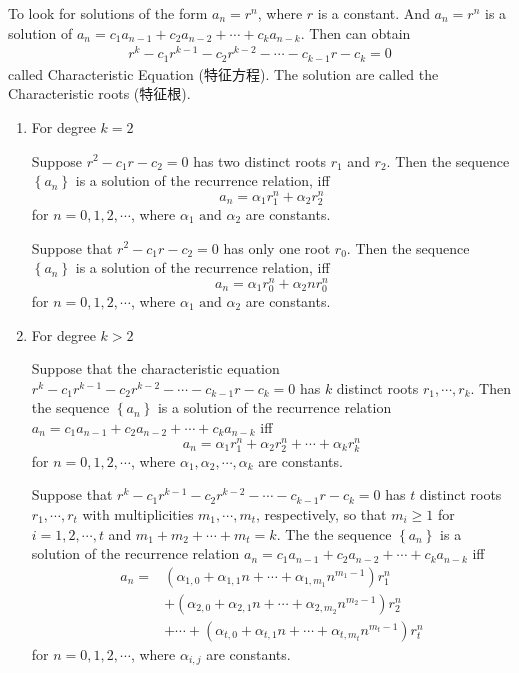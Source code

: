 To look for solutions of the form $a_n=r^n$, where $r$ is a constant. And $a_n=r^n$ is a solution of $a_n = c_1a_{n-1} + c_2a_{n-2}+ \cdots + c_k a_{n-k}$. Then can obtain
\begin{align*}
    r^k-c_1r^{k-1} - c_2r^{k-2}- \cdots - c_{k-1}r- c_k=0
\end{align*}
called Characteristic Equation (特征方程). The solution are called the Characteristic roots (特征根). 
\begin{enumerate}
    \item For degree $k=2$
    \begin{theorem}
        Suppose $r^2-c_1r-c_2=0$ has two distinct roots $r_1$ and $r_2$. Then the sequence $\left\{a_n\right\}$ is a solution of the recurrence relation, iff 
        \[a_n=\alpha_1r_1^n+\alpha_2r_2^n\]
        for $n=0,1,2,\cdots$, where $\alpha_1 \text{ and } \alpha_2$ are constants. 
    \end{theorem}
    \begin{theorem}
        Suppose that $r^2-c_1r-c_2=0$ has only one root $r_0$. Then the sequence $\left\{a_n\right\}$ is a solution of the recurrence relation, iff 
        \[ a_n=\alpha_1 r_0^n + \alpha_2 n r_0^n \]
        for $n=0,1,2,\cdots$, where $\alpha_1 \text{ and } \alpha_2$ are constants. 
    \end{theorem}
    \item For degree $k>2$
    \begin{theorem}
        Suppose that the characteristic equation $r^k-c_1r^{k-1} - c_2r^{k-2}- \cdots - c_{k-1}r- c_k=0$ has $k$ distinct roots $r_1,\cdots,r_k$. Then the sequence $\left\{ a_n \right\}$ is a solution of the recurrence relation $a_n = c_1a_{n-1} + c_2a_{n-2}+ \cdots + c_k a_{n-k}$ iff
        \[ a_n=\alpha_1r_1^n+\alpha_2r_2^n+\cdots +\alpha_kr_k^n \]
        for $n=0,1,2,\cdots$, where $\alpha_1,\alpha_2,\cdots ,\alpha_k$ are constants.
    \end{theorem}

    \begin{theorem}
        Suppose that $r^k-c_1r^{k-1} - c_2r^{k-2}- \cdots - c_{k-1}r- c_k=0$ has $t$ distinct roots $r_1,\cdots, r_t$ with multiplicities $m_1,\cdots, m_t$, respectively, so that $m_i \ge 1$ for $i=1,2,\cdots,t$ and $m_1+m_2+\cdots +m_t=k$. The the sequence $\left\{ a_n \right\}$ is a solution of the recurrence relation $a_n = c_1a_{n-1} + c_2a_{n-2}+ \cdots + c_k a_{n-k}$ iff 
        \begin{align*}
            a_n=&(\alpha_{1,0}+\alpha_{1,1}n+\cdots+\alpha_{1,m_1}n^{m_1-1})r_1^n\\
            &+(\alpha_{2,0}+\alpha_{2,1}n+\cdots+\alpha_{2,m_2}n^{m_2-1})r_2^n\\
            &+\cdots + (\alpha_{t,0}+\alpha_{t,1}n+\cdots+\alpha_{t,m_t}n^{m_t-1})r_t^n
        \end{align*}
        for $n=0,1,2,\cdots$, where $\alpha_{i,j}$ are constants. 
    \end{theorem}
\end{enumerate}

